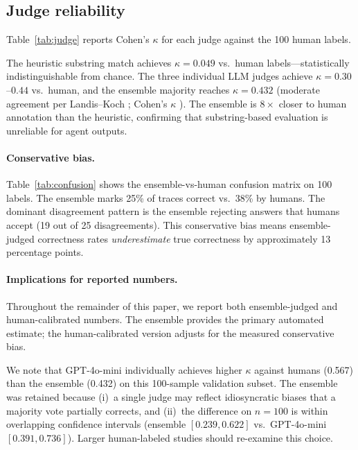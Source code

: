 \documentclass[11pt]{article}
\begin{document}
\subsection{Judge reliability}
\label{sec:judge}

Table~\ref{tab:judge} reports Cohen's $\kappa$ for each judge against
the 100 human labels.

The heuristic substring match achieves $\kappa{=}0.049$ vs.\ human
labels---statistically indistinguishable from chance.
The three individual LLM judges achieve $\kappa{=}0.30$--$0.44$ vs.\
human, and the ensemble majority reaches $\kappa{=}0.432$ (moderate
agreement per Landis--Koch \citep{landis1977kappa};
Cohen's $\kappa$ \citep{cohen1960kappa}).
The ensemble is $8{\times}$ closer to human annotation than the
heuristic, confirming that substring-based evaluation is unreliable
for agent outputs.



\paragraph{Conservative bias.}
Table~\ref{tab:confusion} shows the ensemble-vs-human confusion matrix
on 100 labels.
The ensemble marks 25\% of traces correct vs.\ 38\% by humans.
The dominant disagreement pattern is the ensemble rejecting answers that
humans accept (19 out of 25 disagreements).
This conservative bias means ensemble-judged correctness rates
\emph{underestimate} true correctness by approximately 13 percentage
points.



\paragraph{Implications for reported numbers.}
Throughout the remainder of this paper, we report both ensemble-judged
and human-calibrated numbers.
The ensemble provides the primary automated estimate; the
human-calibrated version adjusts for the measured conservative bias.

We note that GPT-4o-mini individually achieves higher $\kappa$ against
humans (0.567) than the ensemble (0.432) on this 100-sample validation
subset.
The ensemble was retained because (i)~a single judge may reflect
idiosyncratic biases that a majority vote partially corrects, and
(ii)~the difference on $n{=}100$ is within overlapping confidence
intervals (ensemble $[0.239, 0.622]$ vs.\ GPT-4o-mini
$[0.391, 0.736]$).
Larger human-labeled studies should re-examine this choice.
\end{document}
